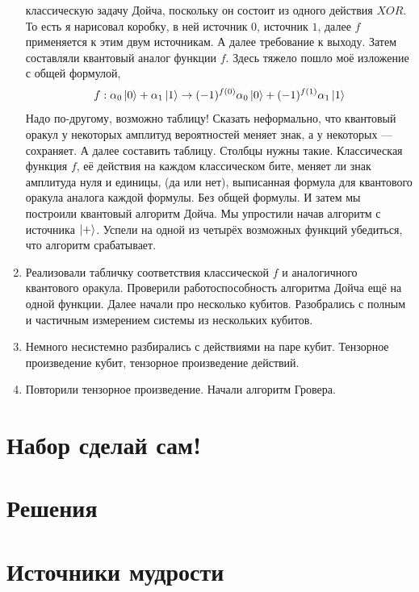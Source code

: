 \documentclass[12pt]{article}
\newcounter{problem}[section]
\theoremstyle{definition}
\begin{document}
\begin{enumerate}
  классическую задачу Дойча, поскольку он состоит из одного действия $XOR$. То есть
  я нарисовал коробку, в ней источник $0$, источник $1$, далее $f$ применяется к
  этим двум источникам. А далее требование к выходу. Затем составляли квантовый
  аналог функции $f$. Здесь тяжело пошло моё изложение с общей формулой,
  \[
   f : \alpha_0 \ket{0} + \alpha_1 \ket{1} \to
   (-1)^{f(0)}\alpha_0 \ket{0} + (-1)^{f(1)}\alpha_1 \ket{1}
  \]
  Надо по-другому, возможно таблицу! Сказать неформально, что квантовый оракул
  у некоторых амплитуд вероятностей меняет знак, а у некоторых — сохраняет.
  А далее составить таблицу. Столбцы нужны такие. Классическая функция $f$,
  её действия на каждом классическом бите, меняет ли знак амплитуда нуля и единицы,
  (да или нет), выписанная формула для квантового оракула аналога каждой формулы.
  Без общей формулы. И затем мы построили
  квантовый алгоритм Дойча. Мы упростили начав алгоритм с источника $\ket{+}$.
  Успели на одной из четырёх возможных функций убедиться, что алгоритм срабатывает.
  \item Реализовали табличку соответствия классической $f$ и
  аналогичного квантового оракула. Проверили работоспособность алгоритма Дойча
  ещё на одной функции. Далее начали про несколько кубитов. Разобрались с полным
  и частичным измерением системы из нескольких кубитов.
  \item Немного несистемно разбирались с действиями на паре кубит. Тензорное произведение
  кубит, тензорное произведение действий.
  \item Повторили тензорное произведение. Начали алгоритм Гровера. 
\end{enumerate}




\renewenvironment{solution}[1]{%
         \vskip .5cm plus 2cm minus 0.1cm%
         {\bfseries \hyperlink{problem:#1}{#1.}}%
}%
{%
}%

\section{Набор сделай сам!}

\cite{stay2014deutch}

\section{Решения}



\section{Источники мудрости}
\printbibliography[heading=none]
\end{document}
